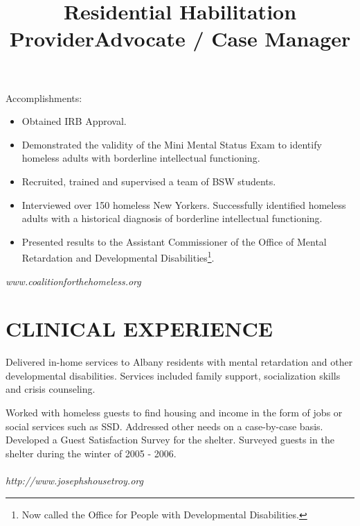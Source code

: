 \documentclass[line, margin, 10pt]{res}
\begin{document}
\begin{resume}
\begin{position}
    Accomplishments:
    \begin{itemize}
    \item Obtained IRB Approval.
    \item Demonstrated the validity of the Mini Mental Status Exam to
      identify homeless adults with borderline intellectual functioning.
    \item Recruited, trained and supervised a team of BSW students.
    \item Interviewed over 150 homeless New Yorkers. Successfully
      identified homeless adults with a historical diagnosis of
      borderline intellectual functioning.
    \item Presented results to the Assistant Commissioner
      of the Office of Mental Retardation and Developmental
      Disabilities\footnote{Now called the Office for People with
        Developmental Disabilities.}.
    \end{itemize}
    \emph{www.coalitionforthehomeless.org}
  \end{position}


  \section{CLINICAL EXPERIENCE}

  \title{Residential Habilitation Provider}
  \begin{position}
    Delivered in-home services to Albany residents with mental
    retardation and other developmental disabilities. Services included
    family support, socialization skills and crisis counseling.
  \end{position}

  \title{Advocate / Case Manager}
  \begin{position}
    Worked with homeless guests to find housing and income in the form
    of jobs or social services such as SSD. Addressed other needs on a case-by-case
    basis. Developed a Guest Satisfaction Survey for the shelter. Surveyed
    guests in the shelter during the winter of 2005 - 2006. \\ \\
    \emph{http://www.josephshousetroy.org}
  \end{position}


\end{resume}
\end{document}
